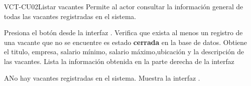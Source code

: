 \begin{UseCase}[]{VCT-CU02}{Listar vacantes}{
	Permite al actor consultar la información general de todas las vacantes registradas en el sistema.
	}
\end{UseCase}

\begin{UCtrayectoria}
	\UCpaso [\UCactor] Presiona el botón  desde la interfaz .
    \UCpaso [\UCsist] Verifica que exista al menos un registro de una vacante que no se encuentre es estado \textbf{cerrada} en la base de datos.
	\UCpaso [\UCsist] Obtiene el titulo, empresa, salario mínimo, salario máximo,ubicación y la descripción  de las vacantes.
	\UCpaso [\UCsist] Lista la información obtenida en la parte derecha de la interfaz 
\end{UCtrayectoria}

\begin{UCtrayectoriaA}{A}{No hay vacantes registradas en el sistema.}
	\UCpaso [\UCsist] Muestra la interfaz .
\end{UCtrayectoriaA}

